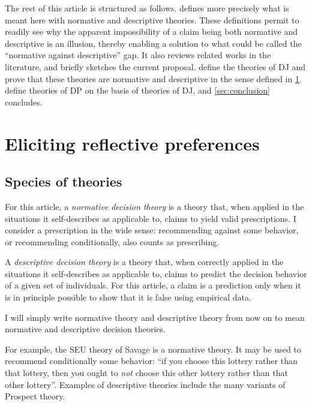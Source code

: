 \documentclass[version=last, pagesize, twoside=off, bibliography=totoc, DIV=calc, fontsize=12pt, a4paper, french, english]{scrartcl}
\begin{document}
The rest of this article is structured as follows.
 defines more precisely what is meant here with normative and descriptive theories. These definitions permit to readily see why the apparent impossibility of a claim being both normative and descriptive is an illusion, thereby enabling a solution to what could be called the “normative against descriptive” gap. It also reviews related works in the literature, and briefly sketches the current proposal.
 define the theories of \ac{DJ} and prove that these theories are normative and descriptive in the sense defined in \cref{sec:approaches}.  define theories of \ac{DP} on the basis of theories of \ac{DJ}, and \cref{sec:conclusion} concludes.

\section{Eliciting reflective preferences}
\label{sec:approaches}
\subsection{Species of theories}
For this article, a \emph{normative decision theory} is a theory that, when applied in the situations it self-describes as applicable to, claims to yield valid prescriptions. I consider a prescription in the wide sense: recommending against some behavior, or recommending conditionally, also counts as prescribing. 

A \emph{descriptive decision theory} is a theory that, when correctly applied in the situations it self-describes as applicable to, claims to predict the decision behavior of a given set of individuals. For this article, a claim is a prediction only when it is in principle possible to show that it is false using empirical data. 

I will simply write normative theory and descriptive theory from now on to mean normative and descriptive decision theories.

For example, the \ac{SEU} theory of Savage is a normative theory. It may be used to recommend conditionally some behavior: “if you choose this lottery rather than that lottery, then you ought to \emph{not} choose this other lottery rather than that other lottery”.
Examples of descriptive theories include the many variants of Prospect theory.
\end{document}
